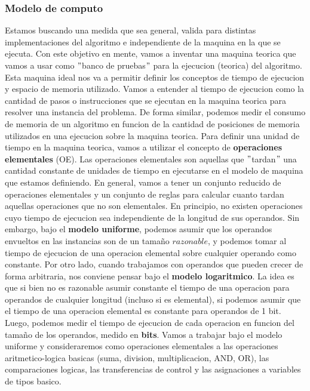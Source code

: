 \documentclass[10pt,a4paper]{article}
\begin{document}
\subsubsection{Modelo de computo}

Estamos buscando una medida que sea general, valida para distintas implementaciones del algoritmo e independiente de la maquina en la que se ejecuta. Con este objetivo en mente, vamos a inventar una maquina teorica que vamos a usar como $"$banco de pruebas$"$ para la ejecucion (teorica) del algoritmo. Esta maquina ideal nos va a permitir definir los conceptos de tiempo de ejecucion y espacio de memoria utilizado. Vamos a entender al tiempo de ejecucion como la cantidad de pasos o instrucciones que se ejecutan en la maquina teorica para resolver una instancia del problema. De forma similar, podemos medir el consumo de memoria de un algoritmo en funcion de la cantidad de posiciones de memoria
utilizados en una ejecucion sobre la maquina teorica.
\newline
\newline
Para definir una unidad de tiempo en la maquina teorica, vamos a utilizar el concepto de \textbf{operaciones elementales} (OE). Las operaciones elementales son aquellas que $"$tardan$"$ una cantidad constante de unidades de tiempo en ejecutarse en el modelo de maquina que estamos definiendo. En general, vamos a tener un conjunto reducido de operaciones elementales y un conjunto de reglas para calcular cuanto tardan aquellas operaciones que no son elementales.
\newline
\newline
En principio, no existen operaciones cuyo tiempo de ejecucion sea independiente de la longitud de sus operandos. Sin embargo, bajo el \textbf{modelo uniforme}, podemos asumir que los operandos envueltos en las instancias son de un tamaño $razonable$, y podemos tomar al tiempo de ejecucion de una operacion elemental sobre cualquier operando como constante. Por otro lado, cuando trabajamos con operandos que pueden crecer de forma arbitraria, nos conviene pensar bajo el \textbf{modelo logaritmico}. La idea es que si bien no es razonable asumir constante el tiempo de una operacion para operandos de cualquier longitud (incluso si es elemental), si podemos asumir que el tiempo de una operacion elemental es constante para operandos de 1 bit. Luego, podemos medir el tiempo de ejecucion de cada operacion en funcion del tamaño de los operandos, medido en \textbf{bits}. Vamos a trabajar bajo el modelo uniforme y consideraremos como operaciones elementales a las operaciones aritmetico-logica basicas (suma, division, multiplicacion, AND, OR), las comparaciones logicas, las transferencias de control y las asignaciones a variables de tipos basico.
\end{document}
